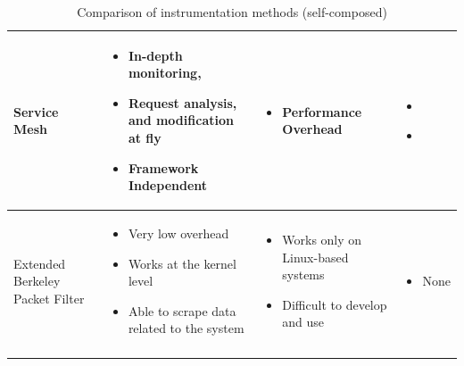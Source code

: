 \begin{longtable}{| p{23mm} | p{42mm} | p{42mm} | p{42mm} |}
    Service Mesh &
    \vspace{-8mm}
    \begin{itemize}[leftmargin=0mm,noitemsep,nolistsep,label={}] 
        \item In-depth monitoring,
        \item Request analysis, and modification at fly
        \item Framework Independent
        \vspace{-7mm}
    \end{itemize} &
    \vspace{-8mm}
    \begin{itemize}[leftmargin=0mm,noitemsep,nolistsep,label={}] 
        \item Performance Overhead
        \vspace{-7mm}
    \end{itemize} &
    \vspace{-8mm}
    \begin{itemize}[leftmargin=0mm,noitemsep,nolistsep,label={}] 
        \item \cite{samir2019dla}
        \item \cite{wu2020microrca}
        \vspace{-7mm}
    \end{itemize} \\ \hline
    
    Extended Berkeley Packet Filter &
    \vspace{-8mm}
    \begin{itemize}[leftmargin=0mm,noitemsep,nolistsep,label={}] 
        \item Very low overhead
        \item Works at the kernel level
        \item Able to scrape data related to the system
        \vspace{-7mm}
    \end{itemize} &
    \vspace{-8mm}
    \begin{itemize}[leftmargin=0mm,noitemsep,nolistsep,label={}] 
        \item Works only on Linux-based systems
        \item Difficult to develop and use
        \vspace{-7mm}
    \end{itemize} &
    \vspace{-8mm}
    \begin{itemize}[leftmargin=0mm,noitemsep,nolistsep,label={}] 
        \item None
        \vspace{-7mm}
    \end{itemize} \\ \hline

    \caption{Comparison of instrumentation methods (self-composed)}
\end{longtable}


